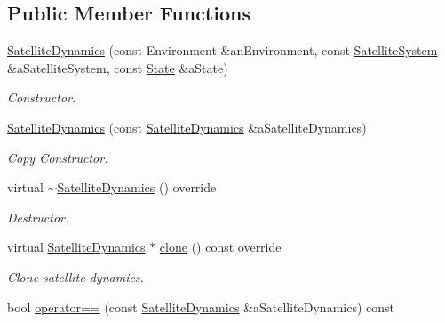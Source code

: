 \subsection*{Public Member Functions}
\begin{DoxyCompactItemize}
\item 
\hyperlink{classostk_1_1astro_1_1flight_1_1system_1_1dynamics_1_1_satellite_dynamics_a756ced12a03832285a4a0fa89b0b8085}{Satellite\+Dynamics} (const Environment \&an\+Environment, const \hyperlink{classostk_1_1astro_1_1flight_1_1system_1_1_satellite_system}{Satellite\+System} \&a\+Satellite\+System, const \hyperlink{classostk_1_1astro_1_1trajectory_1_1_state}{State} \&a\+State)
\begin{DoxyCompactList}\small\item\em Constructor. \end{DoxyCompactList}\item 
\hyperlink{classostk_1_1astro_1_1flight_1_1system_1_1dynamics_1_1_satellite_dynamics_a8ced1fec7e36003eb50b8e15202fa571}{Satellite\+Dynamics} (const \hyperlink{classostk_1_1astro_1_1flight_1_1system_1_1dynamics_1_1_satellite_dynamics}{Satellite\+Dynamics} \&a\+Satellite\+Dynamics)
\begin{DoxyCompactList}\small\item\em Copy Constructor. \end{DoxyCompactList}\item 
virtual \hyperlink{classostk_1_1astro_1_1flight_1_1system_1_1dynamics_1_1_satellite_dynamics_a19f580468419341d3754707917aa835a}{$\sim$\+Satellite\+Dynamics} () override
\begin{DoxyCompactList}\small\item\em Destructor. \end{DoxyCompactList}\item 
virtual \hyperlink{classostk_1_1astro_1_1flight_1_1system_1_1dynamics_1_1_satellite_dynamics}{Satellite\+Dynamics} $\ast$ \hyperlink{classostk_1_1astro_1_1flight_1_1system_1_1dynamics_1_1_satellite_dynamics_a57d066e3876e999e288d00a23fb9ec9c}{clone} () const override
\begin{DoxyCompactList}\small\item\em Clone satellite dynamics. \end{DoxyCompactList}\item 
bool \hyperlink{classostk_1_1astro_1_1flight_1_1system_1_1dynamics_1_1_satellite_dynamics_a911f594991ee3b3a9187a34904118fc6}{operator==} (const \hyperlink{classostk_1_1astro_1_1flight_1_1system_1_1dynamics_1_1_satellite_dynamics}{Satellite\+Dynamics} \&a\+Satellite\+Dynamics) const

\end{DoxyCompactItemize}
